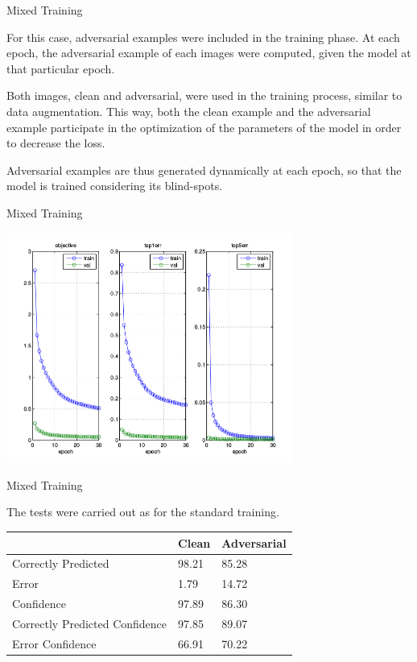 \begin{tframe}{Mixed Training}

For this case, adversarial examples were included in the training phase. At each epoch, the adversarial example of each images were computed, given the model at that particular epoch. 

\vspace{0.1in}

Both images, clean and adversarial, were used in the training process, similar to data augmentation. This way, both the clean example and the adversarial example participate in the optimization of the parameters of the model in order to decrease the loss.

\vspace{0.1in}

Adversarial examples are thus generated dynamically at each epoch, so that the model is trained considering its blind-spots.

\end{tframe}

\begin{tframe}{Mixed Training}

\begin{center}
  \includegraphics[width=0.7\textwidth]{img/train-mix.png}
	\label{train-mix} 
\end{center}

\end{tframe}

\begin{tframe}{Mixed Training}

The tests were carried out as for the standard training.

\begin{table}[h]
\centering
\begin{tabular}{@{}lll@{}}
\toprule
                               & Clean & Adversarial \\ \midrule
Correctly Predicted            & 98.21 & 85.28       \\
Error                          & 1.79  & 14.72       \\
Confidence                     & 97.89 & 86.30       \\
Correctly Predicted Confidence & 97.85 & 89.07       \\
Error Confidence               & 66.91 & 70.22       \\ \bottomrule
\end{tabular}
\end{table}

\end{tframe}